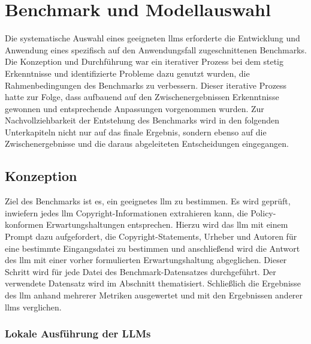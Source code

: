 \chapter{Benchmark und Modellauswahl}\label{ch:benchmark}

Die systematische Auswahl eines geeigneten \glspl{llm} erforderte die Entwicklung und Anwendung eines spezifisch auf den Anwendungsfall zugeschnittenen Benchmarks.
Die Konzeption und Durchführung war ein iterativer Prozess bei dem stetig Erkenntnisse und identifizierte Probleme dazu genutzt wurden, die Rahmenbedingungen des Benchmarks zu verbessern.
Dieser iterative Prozess hatte zur Folge, dass aufbauend auf den Zwischenergebnissen Erkenntnisse gewonnen und entsprechende Anpassungen vorgenommen wurden.
Zur Nachvollziehbarkeit der Entstehung des Benchmarks wird in den folgenden Unterkapiteln nicht nur auf das finale Ergebnis, sondern ebenso auf die Zwischenergebnisse und die daraus abgeleiteten Entscheidungen eingegangen.


\section{Konzeption}\label{sec:konzeption-benchmark}

Ziel des Benchmarks ist es, ein geeignetes \gls{llm} zu bestimmen.
Es wird geprüft, inwiefern jedes \gls{llm} Copyright-Informationen extrahieren kann, die Policy-konformen Erwartungshaltungen entsprechen.
Hierzu wird das \gls{llm} mit einem Prompt dazu aufgefordert, die Copyright-Statements, Urheber und Autoren für eine bestimmte Eingangsdatei zu bestimmen und anschließend wird die Antwort des \gls{llm} mit einer vorher formulierten Erwartungshaltung abgeglichen.
Dieser Schritt wird für jede Datei des Benchmark-Datensatzes durchgeführt.
Der verwendete Datensatz wird im Abschnitt  thematisiert.
Schließlich die Ergebnisse des \gls{llm} anhand mehrerer Metriken ausgewertet und mit den Ergebnissen anderer \glspl{llm} verglichen.

\subsection{Lokale Ausführung der LLMs}\label{subsec:lokale-ausfuehrung}

